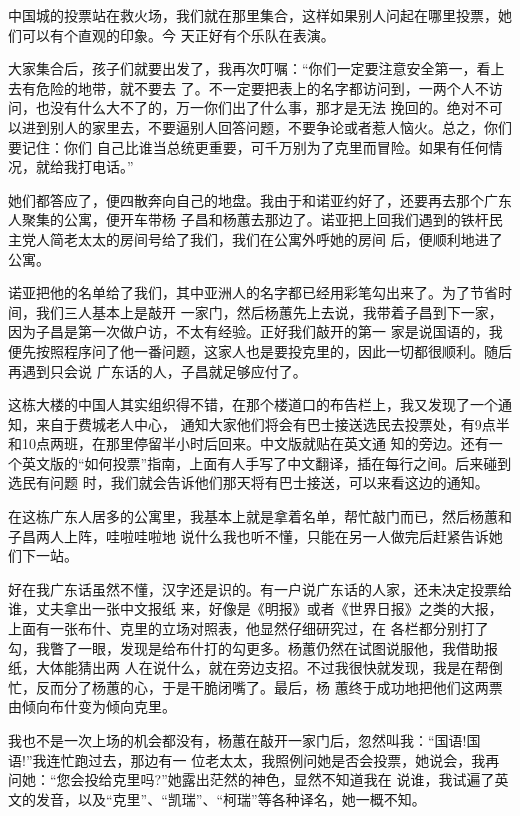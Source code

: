 ﻿\documentclass[11pt]{article}
\begin{document}
中国城的投票站在救火场，我们就在那里集合，这样如果别人问起在哪里投票，她们可以有个直观的印象。今
天正好有个乐队在表演。

大家集合后，孩子们就要出发了，我再次叮嘱：``你们一定要注意安全第一，看上去有危险的地带，就不要去
了。不一定要把表上的名字都访问到，一两个人不访问，也没有什么大不了的，万一你们出了什么事，那才是无法
挽回的。绝对不可以进到别人的家里去，不要逼别人回答问题，不要争论或者惹人恼火。总之，你们要记住：你们
自己比谁当总统更重要，可千万别为了克里而冒险。如果有任何情况，就给我打电话。''

她们都答应了，便四散奔向自己的地盘。我由于和诺亚约好了，还要再去那个广东人聚集的公寓，便开车带杨
子昌和杨蕙去那边了。诺亚把上回我们遇到的铁杆民主党人简老太太的房间号给了我们，我们在公寓外呼她的房间
后，便顺利地进了公寓。

诺亚把他的名单给了我们，其中亚洲人的名字都已经用彩笔勾出来了。为了节省时间，我们三人基本上是敲开
一家门，然后杨蕙先上去说，我带着子昌到下一家，因为子昌是第一次做户访，不太有经验。正好我们敲开的第一
家是说国语的，我便先按照程序问了他一番问题，这家人也是要投克里的，因此一切都很顺利。随后再遇到只会说
广东话的人，子昌就足够应付了。

这栋大楼的中国人其实组织得不错，在那个楼道口的布告栏上，我又发现了一个通知，来自于费城老人中心，
通知大家他们将会有巴士接送选民去投票处，有9点半和10点两班，在那里停留半小时后回来。中文版就贴在英文通
知的旁边。还有一个英文版的``如何投票''指南，上面有人手写了中文翻译，插在每行之间。后来碰到选民有问题
时，我们就会告诉他们那天将有巴士接送，可以来看这边的通知。

在这栋广东人居多的公寓里，我基本上就是拿着名单，帮忙敲门而已，然后杨蕙和子昌两人上阵，哇啦哇啦地
说什么我也听不懂，只能在另一人做完后赶紧告诉她们下一站。

好在我广东话虽然不懂，汉字还是识的。有一户说广东话的人家，还未决定投票给谁，丈夫拿出一张中文报纸
来，好像是《明报》或者《世界日报》之类的大报，上面有一张布什、克里的立场对照表，他显然仔细研究过，在
各栏都分别打了勾，我瞥了一眼，发现是给布什打的勾更多。杨蕙仍然在试图说服他，我借助报纸，大体能猜出两
人在说什么，就在旁边支招。不过我很快就发现，我是在帮倒忙，反而分了杨蕙的心，于是干脆闭嘴了。最后，杨
蕙终于成功地把他们这两票由倾向布什变为倾向克里。

我也不是一次上场的机会都没有，杨蕙在敲开一家门后，忽然叫我：``国语!国语!''我连忙跑过去，那边有一
位老太太，我照例问她是否会投票，她说会，我再问她：``您会投给克里吗?''她露出茫然的神色，显然不知道我在
说谁，我试遍了英文的发音，以及``克里''、``凯瑞''、``柯瑞''等各种译名，她一概不知。
\end{document}
